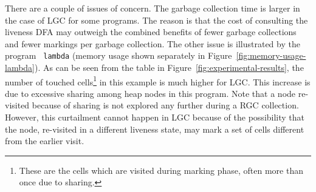 \documentclass[9pt]{sigplanconf}
\begin{document}
There are a couple of  issues of concern.  The garbage collection time
is larger in the case of LGC for some programs. The reason is that the
cost of consulting the liveness DFA may outweigh the combined benefits
of  fewer   garbage  collections   and  fewer  markings   per  garbage
collection.   The  other issue  is  illustrated  by  the program  {\tt
  lambda}    (memory   usage  shown   separately    in
Figure~\ref{fig:memory-usage-lambda}).  As can be seen from the table
in Figure~\ref{fig:experimental-results}, the  number of
touched cells\footnote{These  are the  cells which are  visited during
  marking phase, often  more than once due to  sharing.} in this
example is much higher for
LGC.  This  increase is due to  excessive sharing among  heap nodes in
this program.  Note  that a node re-visited because  of sharing is not
explored  any   further  during  a  RGC   collection.   However,  this
curtailment cannot happen in  LGC because of the possibility that the
node,  re-visited in a  different liveness  state, may  mark a  set of
cells different from the earlier visit.
\end{document}
